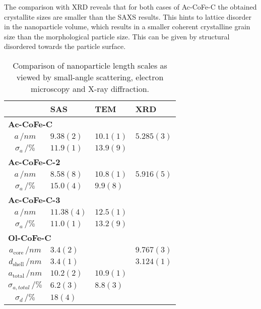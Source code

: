 \documentclass[\main/dresen_thesis.tex]{subfiles}
\begin{document}
    The comparison with XRD reveals that for both cases of Ac-CoFe-C the obtained crystallite sizes are smaller than the SAXS results.
    This hints to lattice disorder in the nanoparticle volume, which results in a smaller coherent crystalline grain size than the morphological particle size.
    This can be given by structural disordered towards the particle surface.

    \begin{table}[!htbp]
      \centering
      \caption{\label{tab:monolayers:nanoparticle:saxs:sizeComparison}Comparison of nanoparticle length scales as viewed by small-angle scattering, electron microscopy and X-ray diffraction.}
      \begin{tabular}{ c | l | l | l }
                            & \textbf{SAS} & \textbf{TEM} & \textbf{XRD}\\
        \hline
        \multicolumn{4}{l}{\textbf{Ac-CoFe-C}}\\
        \hline
        $a \, / \unit{nm}$  & $9.38(2)$       & $10.1(1)$ & $5.285(3)$\\
        $\sigma_a \, / \%$  & $11.9(1)$       & $13.9(9)$ & \\
        \hline
        \multicolumn{4}{l}{\textbf{Ac-CoFe-C-2}}\\
        \hline
        $a \, / \unit{nm}$  & $8.58(8)$       & $10.8(1)$ & $5.916(5)$\\
        $\sigma_a \, / \%$  & $15.0(4)$       & $9.9(8)$  & \\
        \hline
        \multicolumn{4}{l}{\textbf{Ac-CoFe-C-3}}\\
        \hline
        $a \, / \unit{nm}$  & $11.38(4)$       & $12.5(1)$ & \\
        $\sigma_a \, / \%$  & $11.0(1)$        & $13.2(9)$ & \\
        \hline
        \multicolumn{4}{l}{\textbf{Ol-CoFe-C}}\\
        \hline
        $a_\mathrm{core} \, / \unit{nm}$      & $3.4(2)$        &           & $9.767(3)$\\
        $d_\mathrm{shell} \, / \unit{nm}$     & $3.4(1)$        &           & $3.124(1)$\\
        $a_\mathrm{total} \, / \unit{nm}$     & $10.2(2)$       & $10.9(1)$ & \\
        $\sigma_{a, total} \, / \%$           & $6.2(3)$        & $8.8(3)$  & \\
        $\sigma_{d} \, / \%$                  & $18(4)$         &           & \\
        \hline
      \end{tabular}
    \end{table}
\end{document}
